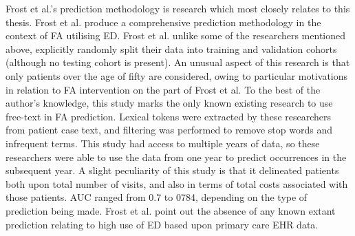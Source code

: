 Frost et al.'s prediction methodology \cite{frost2017using} is research which most closely relates to this thesis. Frost et al. produce a comprehensive prediction methodology in the context of FA utilising ED. Frost et al. unlike some of the researchers mentioned above, explicitly randomly split their data into training and validation cohorts (although no testing cohort is present). An unusual aspect of this research is that only patients over the age of fifty are considered, owing to particular motivations in relation to FA intervention on the part of Frost et al. To the best of the author's knowledge, this study marks the only known existing research to use free-text in FA prediction. Lexical tokens were extracted by these researchers from patient case text, and filtering was performed to remove stop words and infrequent terms. This study had access to multiple years of data, so these researchers were able to use the data from one year to predict occurrences in the subsequent year. A slight peculiarity of this study is that it delineated patients both upon total number of visits, and also in terms of total costs associated with those patients. AUC ranged from 0.7 to 0784, depending on the type of prediction being made. Frost et al. point out the absence of any known extant prediction relating to high use of ED based upon primary care EHR data. 




